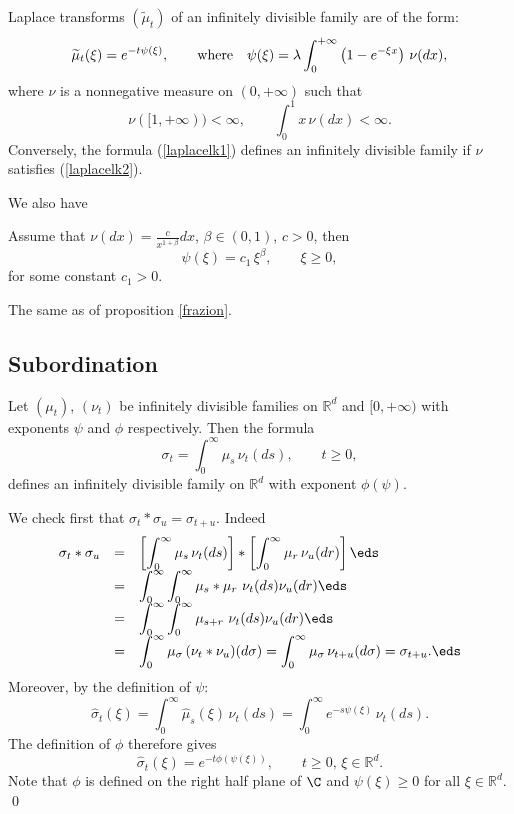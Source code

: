 \documentclass[preprint]{imsart}
\def\R{\mathbb R}
\def\ds{\displaystyle}
\begin{document}
{\begin{Theorem}
Laplace transforms $(\widetilde{\mu}_t)$ of an
infinitely divisible family are of the form:
\begin{equation}\label{laplacelk1}
\widetilde{\mu}_t(\xi ) =e^{-t\psi (\xi)},\qquad
{\rm where}\quad
\psi (\xi)= \lambda \int_0^{+\infty} \left(
1-e^{-\xi x}\right) \, \nu (dx),
\end{equation}
where $\nu$ is a nonnegative measure on $(0,+\infty)$
such that
\begin{equation}\label{laplacelk2}
\nu ([1,+\infty))<\infty,\qquad
\int_0^1x\, \nu(dx)<\infty.
\end{equation}
Conversely, the formula (\ref{laplacelk1}) defines an
infinitely divisible family if $\nu$ satisfies
 (\ref{laplacelk2}).
\end{Theorem}
We also have

\begin{Proposition}
Assume that $\nu(dx) =\frac{c}{x^{1+\beta}}dx$,
$\beta\in (0,1)$, $c>0$, then
$$
\psi (\xi)=c_1\, \xi^\beta,\qquad\xi\geq 0,
$$
for some    constant $c_1>0$.
\end{Proposition}

The same as of proposition \ref{frazion}.


\subsection{Subordination}


\begin{Theorem}
Let $(\mu_t)$, $(\nu_t)$ be infinitely divisible
families on $\R^d$ and  $[0,+\infty)$
 with exponents $\psi$
and $\phi$ respectively. Then the formula
$$
\sigma_t=\int_0^\infty \mu_s\, \nu_t(ds),\qquad t\geq 0,
$$
defines an infinitely divisible family on $\R^d$ with
 exponent $\phi (\psi )$.
\end{Theorem}

We check first that $\sigma_t*\sigma_u=\sigma_{t+u}$.
Indeed
$$
  \begin{array}{lll}
    \sigma_t*\sigma_u&= &\ds
\left[ \int_0^\infty \mu_s\, \nu_t(ds)\right] *
\left[ \int_0^\infty \mu_r\, \nu_u(dr)\right]
\eds
     \\
    &= & \ds
 \int_0^\infty  \int_0^\infty
 \mu_s * \mu_r\, \, \nu_t(ds) \nu_u(dr)
 \eds
  \\
    &= & \ds
 \int_0^\infty  \int_0^\infty
 \mu_{s +r}\, \, \nu_t(ds) \nu_u(dr)
 \eds
 \\
    &= & \ds
 \int_0^\infty
 \mu_{\sigma}\, ( \nu_t* \nu_u)(d\sigma)
 =\int_0^\infty
 \mu_{\sigma}\,  \nu_{t+u}(d\sigma)=\sigma_{t+u}.
 \eds
  \end{array}
$$
Moreover, by the definition of $\psi$:
$$
\widehat{\sigma}_t(\xi) =\int_0^\infty
\widehat{\mu}_s(\xi)\,\nu_t(ds)=
\int_0^\infty
e^{-s\psi (\xi)} \,\nu_t(ds).
$$
The definition of $\phi$ therefore gives
$$
\widehat{\sigma}_t(\xi) =
e^{-t\phi(\psi (\xi))},\qquad t\geq 0,\,\xi\in\R^d.
$$
Note that $\phi$ is defined on the right half plane of
$\C$ and $\psi (\xi)\geq 0$ for all $\xi\in\R^d$. \qed




}
\end{document}
